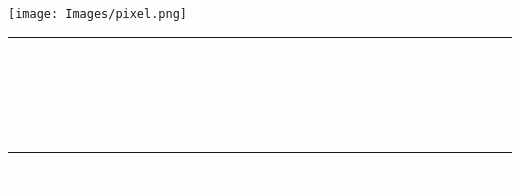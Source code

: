 \begin{titlepage}
\AddToShipoutPicture*{\BackgroundPic}

{ \texttt{[image: Images/pixel.png]}\\[2cm] 
\raggedleft

\Huge \bfseries \textcolor{white}{\hrule 
\vspace{5mm}CORINA MANUAL}\\[3mm] 
\large{\textcolor{white}{For users and developers
\vspace{5mm}
\hrule}}

\vspace{3cm}
}

{
\normalsize
\raggedleft\textbf{\textcolor{white}{By Peter W.\ Brewer and Ken Harris}}\\[0.6cm]
}

\vfill

{\footnotesize
}

\end{titlepage}
